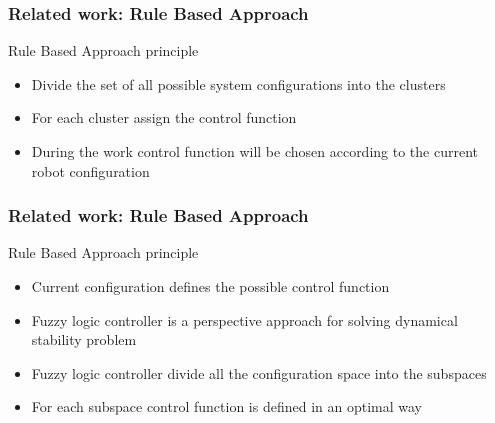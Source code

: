 \documentclass{beamer}
\begin{document}

	\begin{frame}
		\frametitle{Related work: Rule Based Approach}
		\begin{block}{Rule Based Approach principle}
			\begin{itemize}
				\item
					Divide the set of all possible system configurations into the clusters
				\item 
					For each cluster assign the control function
				\item During the work control function will be chosen according to the current robot configuration
			\end{itemize}
		\end{block}
	\end{frame}


	\begin{frame}
		\frametitle{Related work: Rule Based Approach}
		\begin{block}{Rule Based Approach principle}
			\begin{itemize}
				\item
				Current configuration defines the possible control function
				\item Fuzzy logic controller is a perspective approach for solving dynamical stability problem
				\item Fuzzy logic controller divide all the configuration space into the subspaces
				\item For each subspace control function is defined in an optimal way
			\end{itemize}
		\end{block}
	\end{frame}
	
	
\end{document}
